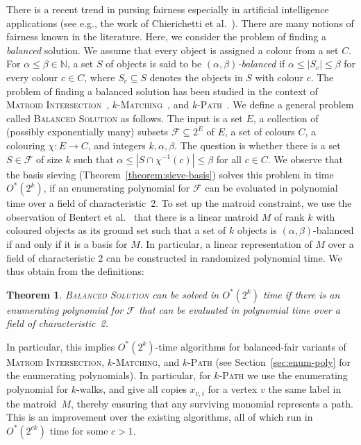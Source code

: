\documentclass[10pt,a4paper]{article}
\newtheorem{theorem}{Theorem}[section]
\newcommand{\N}{\ensuremath{\mathbb N}\xspace}
\newcommand{\cF}{\ensuremath{\mathcal F}\xspace}
\begin{document}
There is a recent trend in pursing fairness especially in artificial intelligence applications (see e.g., the work of Chierichetti et al.~\cite{Chierichetti0LV17}).
There are many notions of fairness known in the literature.
Here, we consider the problem of finding a \emph{balanced} solution.
We assume that every object is assigned a colour from a set $C$.
For $\alpha \le \beta \in \N$, a set $S$ of objects is said to be \emph{$(\alpha, \beta)$-balanced} if $\alpha \le |S_c| \le \beta$ for every colour $c \in C$, where $S_c \subseteq S$ denotes the objects in $S$ with colour $c$.
The problem of finding a balanced solution has been studied in the context of \textsc{Matroid Intersection}~\cite{Chierichetti0LV19}, \textsc{$k$-Matching}~\cite{BandyapadhyayFIS23}, and \textsc{$k$-Path}~\cite{BentertKN23}.
We define a general problem called \textsc{Balanced Solution} as follows.
The input is a set $E$, a collection of (possibly exponentially many) subsets $\cF \subseteq 2^E$ of $E$, a set of colours $C$, a colouring $\chi \colon E \to C$, and integers $k, \alpha, \beta$.
The question is whether there is a set $S \in \cF$ of size $k$ such that $\alpha \le |S \cap \chi^{-1}(c)| \le \beta$ for all $c \in C$.
We observe that the basis sieving (Theorem~\ref{theorem:sieve-basis}) solves this problem in time $O^*(2^k)$, if an enumerating polynomial for $\mathcal{F}$ can be evaluated in polynomial time over a field of characteristic~2.
To set up the matroid constraint, we use the observation of Bentert et al.~\cite{BentertKN23} that there is a linear matroid $M$ of rank $k$ with coloured objects as its ground set such that a set of $k$ objects is $(\alpha, \beta)$-balanced if and only if it is a basis for $M$.
In particular, a linear representation of $M$ over a field of characteristic 2 can be constructed in randomized polynomial time.
We thus obtain from the definitions:

\begin{theorem}
  \textsc{Balanced Solution} can be solved in $O^*(2^k)$ time if there is an enumerating polynomial for $\cF$ that can be evaluated in polynomial time over a field of characteristic~2.
\end{theorem}

In particular, this implies $O^*(2^k)$-time algorithms for balanced-fair variants of \textsc{Matroid Intersection}, \textsc{$k$-Matching}, and \textsc{$k$-Path} (see Section~\ref{sec:enum-poly} for the enumerating polynomials).
In particular, for \textsc{$k$-Path} we use the enumerating polynomial for $k$-walks, and give all copies $x_{v,i}$ for a vertex $v$ the same label in the matroid~$M$,
thereby ensuring that any surviving monomial represents a path.
This is an improvement over the existing algorithms, all of which run in $O^*(2^{ck})$ time for some $c > 1$.
\end{document}
